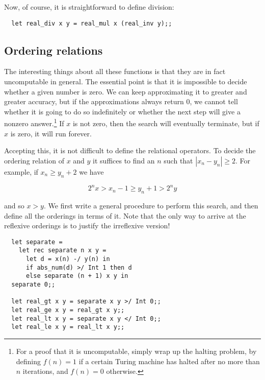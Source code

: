 \noindent Now, of course, it is straightforward to define division:

\begin{boxed}\begin{lstlisting}
  let real_div x y = real_mul x (real_inv y);;
\end{lstlisting}\end{boxed}

\subsection{Ordering relations}

The interesting things about all these functions is that they are in fact
uncomputable in general. The essential point is that it is impossible to decide
whether a given number is zero. We can keep approximating it to greater and
greater accuracy, but if the approximations always return $0$, we cannot tell
whether it is going to do so indefinitely or whether the next step will give a
nonzero answer.\footnote{For a proof that it is uncomputable, simply wrap up
the halting problem, by defining $f(n) = 1$ if a certain Turing machine has
halted after no more than $n$ iterations, and $f(n) = 0$ otherwise.} If $x$ is
not zero, then the search will eventually terminate, but if $x$ is zero, it
will run forever.

Accepting this, it is not difficult to define the relational operators. To
decide the ordering relation of $x$ and $y$ it suffices to find an $n$ such
that $|x_n - y_n| \geq 2$. For example, if $x_n \geq y_n + 2$ we have

$$ 2^n x > x_n - 1 \geq y_n + 1 > 2^n y $$

\noindent and so $x > y$. We first write a general procedure to perform this
search, and then define all the orderings in terms of it. Note that the only
way to arrive at the reflexive orderings is to justify the irreflexive version!

\begin{boxed}\begin{lstlisting}
  let separate = 
    let rec separate n x y =
      let d = x(n) -/ y(n) in
      if abs_num(d) >/ Int 1 then d
      else separate (n + 1) x y in
  separate 0;;

  let real_gt x y = separate x y >/ Int 0;;
  let real_ge x y = real_gt x y;;
  let real_lt x y = separate x y </ Int 0;;
  let real_le x y = real_lt x y;;
\end{lstlisting}\end{boxed}

